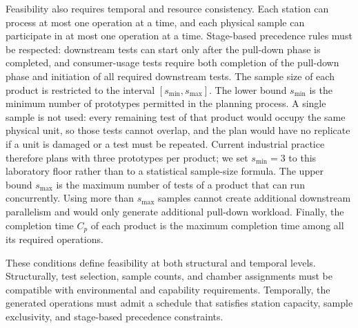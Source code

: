 Feasibility also requires temporal and resource consistency. Each station can process at most one operation at a time, and each physical sample can participate in at most one operation at a time. Stage-based precedence rules must be respected: downstream tests can start only after the pull-down phase is completed, and consumer-usage tests require both completion of the pull-down phase and initiation of all required downstream tests. The sample size of each product is restricted to the interval \([s_{\min},s_{\max}]\). The lower bound \(s_{\min}\) is the minimum number of prototypes permitted in the planning process. A single sample is not used: every remaining test of that product would occupy the same physical unit, so those tests cannot overlap, and the plan would have no replicate if a unit is damaged or a test must be repeated. Current industrial practice therefore plans with three prototypes per product; we set \(s_{\min}=3\) to this laboratory floor rather than to a statistical sample-size formula. The upper bound \(s_{\max}\) is the maximum number of tests of a product that can run concurrently. Using more than \(s_{\max}\) samples cannot create additional downstream parallelism and would only generate additional pull-down workload. Finally, the completion time \(C_p\) of each product is the maximum completion time among all its required operations.

These conditions define feasibility at both structural and temporal levels. Structurally, test selection, sample counts, and chamber assignments must be compatible with environmental and capability requirements. Temporally, the generated operations must admit a schedule that satisfies station capacity, sample exclusivity, and stage-based precedence constraints.
